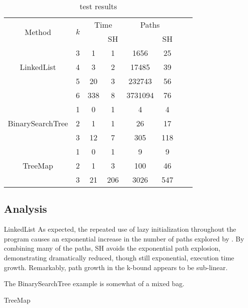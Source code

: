 
\begin{table} [h]
  \centering
  \begin{tabular}{| c | c | c | c | c | c | c | c |}
  \hline
   \multirow{2}{*}{Method }&\multirow{2}{*}{ $k$ }
   &\multicolumn{2}{|c|}{Time} &\multicolumn{2}{|c|}{ Paths }\\
								&	&\gsetxt{}	&SH	&\gsetxt{} & SH\\
   \hline
    \multirow{3}{*}{LinkedList }&3	& 1 & 1  &1656 & 25		 \\
   		 				& 4	& 3 & 2	&17485  & 39 \\
   						& 5	& 20 & 3	&232743 & 56\\
						& 6	& 338 & 8		&3731094 & 76\\
    \hline
    \multirow{3}{*}{BinarySearchTree }&1	& 0 & 1	& 4	 & 4\\
   		 				& 2	& 1 & 1 	& 26 & 17\\
   						& 3	& 12 & 7	& 305 & 118\\
    \hline
      \multirow{3}{*}{TreeMap}&1	& 0 & 1 	&9 & 9 \\
   		 				&2	& 1 & 3		& 100 & 46 \\
   						&3	&21 & 206	& 3026 & 547 \\
						
    \hline
  \end{tabular}
  \caption{test results}
  \label{tab:results}
\end{table}

\subsection{Analysis}

LinkedList
As expected, the repeated use of lazy initialization throughout the program causes an exponential increase in the number of paths explored by \gsetxt{}. By combining many of the \gsetxt{} paths, SH avoids the exponential path explosion, demonstrating dramatically reduced, though still exponential, execution time growth. Remarkably, path growth in the k-bound appears to be sub-linear.

The BinarySearchTree example is somewhat of a mixed bag. 

TreeMap

